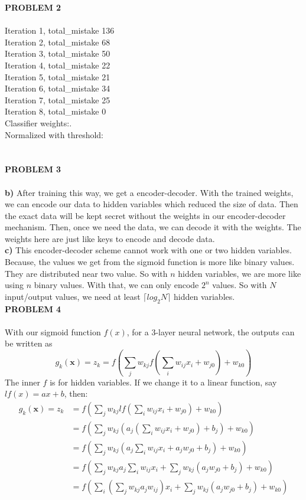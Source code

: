 \documentclass[11pt,a4paper,fleqn]{article}
\begin{document}
\newpage \noindent
\textbf{PROBLEM 2}\\ \\
Iteration 1, total\_mistake 136\\
Iteration 2, total\_mistake 68\\
Iteration 3, total\_mistake 50\\
Iteration 4, total\_mistake 22\\
Iteration 5, total\_mistake 21\\
Iteration 6, total\_mistake 34\\
Iteration 7, total\_mistake 25\\
Iteration 8, total\_mistake 0\\
Classifier weights:.\\
Normalized with threshold: \\
\\ \\
\textbf{PROBLEM 3}\\ \\
\textbf{b)} 
After training this way, we get a encoder-decoder. With the trained weights, we can encode our data to hidden variables which reduced the size of data. Then the exact data will be kept secret without the weights in our encoder-decoder mechanism. Then, once we need the data, we can decode it with the weights. The weights here are just like keys to encode and decode data.\\
\textbf{c)}
 This encoder-decoder scheme cannot work with one or two hidden variables. Because, the values we get from the sigmoid function is more like binary values. They are distributed near two value. So with $n$ hidden variables, we are more like using $n$ binary values. With that, we can only encode $2^n$ values. So with $N$ input/output values, we need at least $\lceil log_2N \rceil$ hidden variables.\\
\newpage \noindent
\textbf{PROBLEM 4}\\ \\
With our sigmoid function $f(x)$, for a 3-layer neural network, the outputs can be written as
$$g_k(\mathbf{x})=z_k=f(\sum_jw_{kj}f(\sum_iw_{ij}x_i+w_{j0})+w_{k0})$$
The inner $f$ is for hidden variables. If we change it to a linear function, say $lf(x) = ax+b$, then:
\begin{equation}
\begin{aligned}
\nonumber
g_k(\mathbf{x})=z_k&=f(\sum_jw_{kj}lf(\sum_iw_{ij}x_i+w_{j0})+w_{k0})\\
&=f(\sum_jw_{kj}(a_j(\sum_iw_{ij}x_i+w_{j0})+b_j)+w_{k0})\\
&=f(\sum_jw_{kj}(a_j\sum_iw_{ij}x_i+a_jw_{j0}+b_j)+w_{k0})\\
&=f(\sum_jw_{kj}a_j\sum_iw_{ij}x_i+\sum_jw_{kj}(a_jw_{j0}+b_j)+w_{k0})\\
&=f(\sum_i(\sum_jw_{kj}a_jw_{ij})x_i+\sum_jw_{kj}(a_jw_{j0}+b_j)+w_{k0})\\
\end{aligned}
\end{equation}
\end{document}
